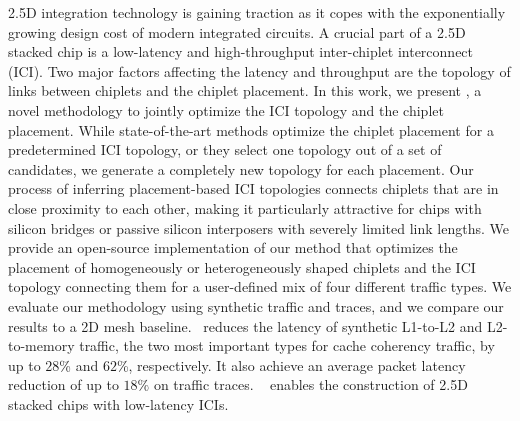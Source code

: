 2.5D integration technology is gaining traction as it copes with the exponentially growing design cost of modern integrated circuits. 
A crucial part of a 2.5D stacked chip is a low-latency and high-throughput inter-chiplet interconnect (ICI).
Two major factors affecting the latency and throughput are the topology of links between chiplets and the chiplet placement.
In this work, we present \name, a novel methodology to jointly optimize the ICI topology and the chiplet placement.
While state-of-the-art methods optimize the chiplet placement for a predetermined ICI topology, or they select one topology out of a set of candidates, we generate a completely new topology for each placement.
Our process of inferring placement-based ICI topologies connects chiplets that are in close proximity to each other, making it particularly attractive for chips with silicon bridges or passive silicon interposers with severely limited link lengths.
We provide an open-source implementation of our method that optimizes the placement of homogeneously or heterogeneously shaped chiplets and the ICI topology connecting them for a user-defined mix of four different traffic types.
We evaluate our methodology using synthetic traffic and traces, and we compare our results to a 2D mesh baseline.
\name~reduces the latency of synthetic L1-to-L2 and L2-to-memory traffic, the two most important types for cache coherency traffic, by up to $28$\% and $62$\%, respectively.
It also achieve an average packet latency reduction of up to $18\%$ on traffic traces.
\name~ enables the construction of 2.5D stacked chips with low-latency ICIs.


